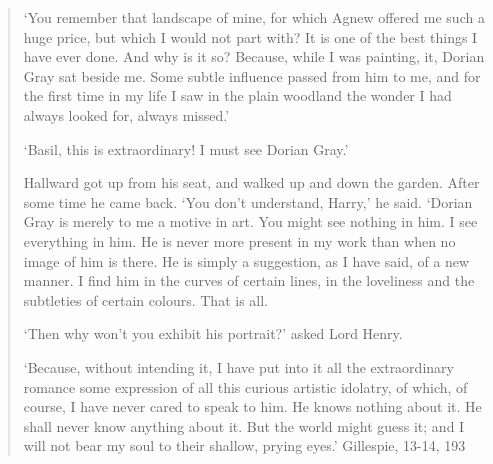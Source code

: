 \documentclass[11pt]{article}
\begin{document}
\begin{quote}
‘You remember that landscape of mine, for which Agnew offered me such
a huge price, but which I would not part with? It is one of the best
things I have ever done. And why is it so? Because, while I was
painting, it, Dorian Gray sat beside me. Some subtle influence passed
from him to me, and for the first time in my life I saw in the plain
woodland the wonder I had always looked for, always missed.’

‘Basil, this is extraordinary! I must see Dorian Gray.’

Hallward got up from his seat, and walked up and down the garden.
After some time he came back. ‘You don’t understand, Harry,’ he
said. ‘Dorian Gray is merely to me a motive in art. You might see
nothing in him. I see everything in him. He is never more present in
my work than when no image of him is there. He is simply a suggestion,
as I have said, of a new manner. I find him in the curves of certain
lines, in the loveliness and the subtleties of certain colours. That
is all.

‘Then why won’t you exhibit his portrait?’ asked Lord Henry.

‘Because, without intending it, I have put into it all the
extraordinary romance some expression of all this curious artistic
idolatry, of which, of course, I have never cared to speak to him. He
knows nothing about it. He shall never know anything about it. But the
world might guess it; and I will not bear my soul to their shallow,
prying eyes.' Gillespie, 13-14, 193
\end{quote}
\end{document}
